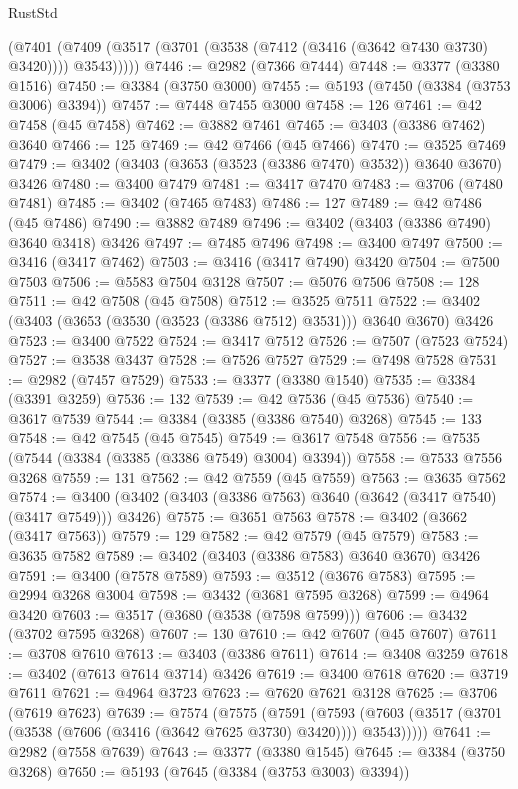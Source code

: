 \begin{lexlean}{RustStd}
\begin{coremodule}
        (@7401 (@7409 (@3517 (@3701 (@3538 (@7412 (@3416 (@3642 @7430 @3730) @3420)))) @3543)))))
@7446 := @2982 (@7366 @7444)
@7448 := @3377 (@3380 @1516)
@7450 := @3384 (@3750 @3000)
@7455 := @5193 (@7450 (@3384 (@3753 @3006) @3394))
@7457 := @7448 @7455 @3000
@7458 := 126
@7461 := @42 @7458 (@45 @7458)
@7462 := @3882 @7461
@7465 := @3403 (@3386 @7462) @3640
@7466 := 125
@7469 := @42 @7466 (@45 @7466)
@7470 := @3525 @7469
@7479 := @3402 (@3403 (@3653 (@3523 (@3386 @7470) @3532)) @3640 @3670) @3426
@7480 := @3400 @7479
@7481 := @3417 @7470
@7483 := @3706 (@7480 @7481)
@7485 := @3402 (@7465 @7483)
@7486 := 127
@7489 := @42 @7486 (@45 @7486)
@7490 := @3882 @7489
@7496 := @3402 (@3403 (@3386 @7490) @3640 @3418) @3426
@7497 := @7485 @7496
@7498 := @3400 @7497
@7500 := @3416 (@3417 @7462)
@7503 := @3416 (@3417 @7490) @3420
@7504 := @7500 @7503
@7506 := @5583 @7504 @3128
@7507 := @5076 @7506
@7508 := 128
@7511 := @42 @7508 (@45 @7508)
@7512 := @3525 @7511
@7522 := @3402 (@3403 (@3653 (@3530 (@3523 (@3386 @7512) @3531))) @3640 @3670) @3426
@7523 := @3400 @7522
@7524 := @3417 @7512
@7526 := @7507 (@7523 @7524)
@7527 := @3538 @3437
@7528 := @7526 @7527
@7529 := @7498 @7528
@7531 := @2982 (@7457 @7529)
@7533 := @3377 (@3380 @1540)
@7535 := @3384 (@3391 @3259)
@7536 := 132
@7539 := @42 @7536 (@45 @7536)
@7540 := @3617 @7539
@7544 := @3384 (@3385 (@3386 @7540) @3268)
@7545 := 133
@7548 := @42 @7545 (@45 @7545)
@7549 := @3617 @7548
@7556 := @7535 (@7544 (@3384 (@3385 (@3386 @7549) @3004) @3394))
@7558 := @7533 @7556 @3268
@7559 := 131
@7562 := @42 @7559 (@45 @7559)
@7563 := @3635 @7562
@7574 := @3400 (@3402 (@3403 (@3386 @7563) @3640 (@3642 (@3417 @7540) (@3417 @7549))) @3426)
@7575 := @3651 @7563
@7578 := @3402 (@3662 (@3417 @7563))
@7579 := 129
@7582 := @42 @7579 (@45 @7579)
@7583 := @3635 @7582
@7589 := @3402 (@3403 (@3386 @7583) @3640 @3670) @3426
@7591 := @3400 (@7578 @7589)
@7593 := @3512 (@3676 @7583)
@7595 := @2994 @3268 @3004
@7598 := @3432 (@3681 @7595 @3268)
@7599 := @4964 @3420
@7603 := @3517 (@3680 (@3538 (@7598 @7599)))
@7606 := @3432 (@3702 @7595 @3268)
@7607 := 130
@7610 := @42 @7607 (@45 @7607)
@7611 := @3708 @7610
@7613 := @3403 (@3386 @7611)
@7614 := @3408 @3259
@7618 := @3402 (@7613 @7614 @3714) @3426
@7619 := @3400 @7618
@7620 := @3719 @7611
@7621 := @4964 @3723
@7623 := @7620 @7621 @3128
@7625 := @3706 (@7619 @7623)
@7639 := @7574
    (@7575
      (@7591
        (@7593 (@7603 (@3517 (@3701 (@3538 (@7606 (@3416 (@3642 @7625 @3730) @3420)))) @3543)))))
@7641 := @2982 (@7558 @7639)
@7643 := @3377 (@3380 @1545)
@7645 := @3384 (@3750 @3268)
@7650 := @5193 (@7645 (@3384 (@3753 @3003) @3394))

\end{coremodule}
\end{lexlean}
